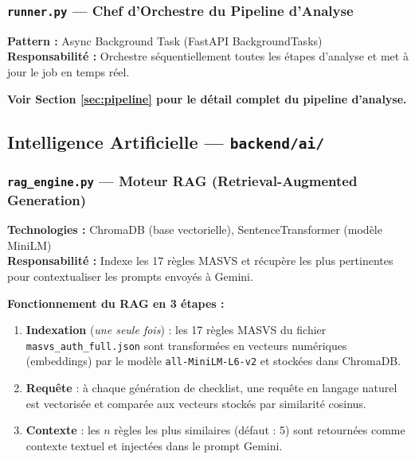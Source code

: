 \documentclass[12pt,a4paper,french]{article}
\newcommand{\file}[1]{\textcolor{primary}{\texttt{#1}}}
\begin{document}
\subsubsection{\file{runner.py} — Chef d'Orchestre du Pipeline d'Analyse}

\begin{tcolorbox}[toolbox, title={Rôle : Coordination complète du pipeline SAST/DAST/IA}]
\textbf{Pattern :} Async Background Task (FastAPI BackgroundTasks)\\
\textbf{Responsabilité :} Orchestre séquentiellement toutes les étapes d'analyse et
met à jour le job en temps réel.
\end{tcolorbox}

\textbf{Voir Section \ref{sec:pipeline} pour le détail complet du pipeline d'analyse.}

\subsection{Intelligence Artificielle — \file{backend/ai/}}

\subsubsection{\file{rag\_engine.py} — Moteur RAG (Retrieval-Augmented Generation)}

\begin{tcolorbox}[toolbox, title={Rôle : Base de Connaissances Vectorielle MASVS}]
\textbf{Technologies :} ChromaDB (base vectorielle), SentenceTransformer (modèle MiniLM)\\
\textbf{Responsabilité :} Indexe les 17 règles MASVS et récupère les plus pertinentes
pour contextualiser les prompts envoyés à Gemini.
\end{tcolorbox}

\textbf{Fonctionnement du RAG en 3 étapes :}

\begin{enumerate}[leftmargin=1.8cm, itemsep=4pt]
  \item \textbf{Indexation} (\textit{une seule fois}) : les 17 règles MASVS du fichier
    \file{masvs\_auth\_full.json} sont transformées en vecteurs numériques (embeddings)
    par le modèle \texttt{all-MiniLM-L6-v2} et stockées dans ChromaDB.

  \item \textbf{Requête} : à chaque génération de checklist, une requête en langage naturel
    est vectorisée et comparée aux vecteurs stockés par similarité cosinus.

  \item \textbf{Contexte} : les $n$ règles les plus similaires (défaut : 5) sont retournées
    comme contexte textuel et injectées dans le prompt Gemini.
\end{enumerate}
\end{document}
